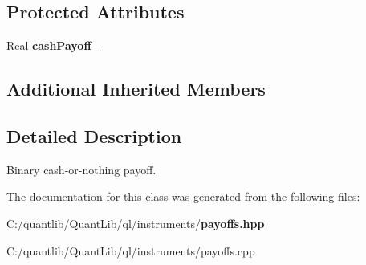 \subsection*{Protected Attributes}
\begin{DoxyCompactItemize}
\item 
Real {\bfseries cash\+Payoff\+\_\+}\label{class_quant_lib_1_1_cash_or_nothing_payoff_a351d02a12e3211a69cb832d3a215a7cc}

\end{DoxyCompactItemize}
\subsection*{Additional Inherited Members}


\subsection{Detailed Description}
Binary cash-\/or-\/nothing payoff. 

The documentation for this class was generated from the following files\+:\begin{DoxyCompactItemize}
\item 
C\+:/quantlib/\+Quant\+Lib/ql/instruments/{\bf payoffs.\+hpp}\item 
C\+:/quantlib/\+Quant\+Lib/ql/instruments/payoffs.\+cpp\end{DoxyCompactItemize}
